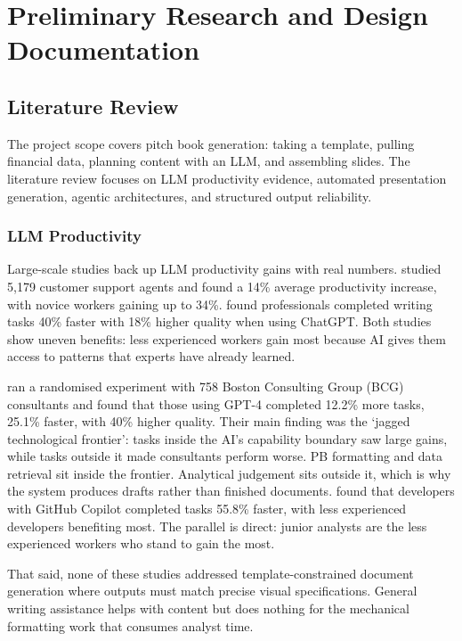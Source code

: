 \section{Preliminary Research and Design Documentation}
\label{sec:research-design}

\subsection{Literature Review}

The project scope covers pitch book generation: taking a template, pulling financial data, planning content with an LLM, and assembling slides. The literature review focuses on LLM productivity evidence, automated presentation generation, agentic architectures, and structured output reliability.

\subsubsection{LLM Productivity}

Large-scale studies back up LLM productivity gains with real numbers. \textcite{brynjolfsson2023} studied 5,179 customer support agents and found a 14\% average productivity increase, with novice workers gaining up to 34\%. \textcite{noy2023} found professionals completed writing tasks 40\% faster with 18\% higher quality when using ChatGPT. Both studies show uneven benefits: less experienced workers gain most because AI gives them access to patterns that experts have already learned.

\textcite{dellacqua2023} ran a randomised experiment with 758 Boston Consulting Group (BCG) consultants and found that those using GPT-4 completed 12.2\% more tasks, 25.1\% faster, with 40\% higher quality. Their main finding was the `jagged technological frontier': tasks inside the AI's capability boundary saw large gains, while tasks outside it made consultants perform worse. PB formatting and data retrieval sit inside the frontier. Analytical judgement sits outside it, which is why the system produces drafts rather than finished documents. \textcite{peng2023} found that developers with GitHub Copilot completed tasks 55.8\% faster, with less experienced developers benefiting most. The parallel is direct: junior analysts are the less experienced workers who stand to gain the most.

That said, none of these studies addressed template-constrained document generation where outputs must match precise visual specifications. General writing assistance helps with content but does nothing for the mechanical formatting work that consumes analyst time.

